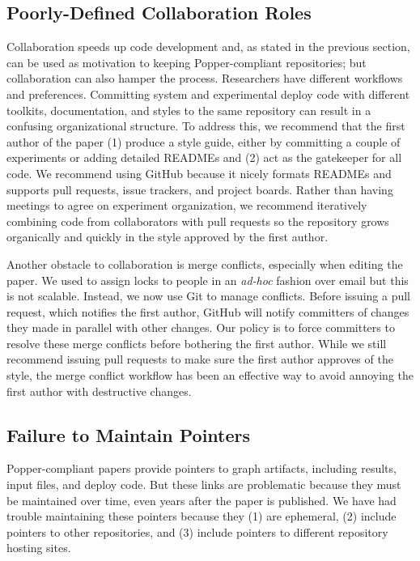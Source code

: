 \subsection{Poorly-Defined Collaboration Roles}

Collaboration  speeds up code development and, as stated in the previous
section, can be used as motivation to keeping Popper-compliant repositories;
but collaboration can also hamper the process.  Researchers have different
workflows and preferences. Committing system and experimental deploy code with
different toolkits, documentation, and styles to the same repository can result
in a confusing organizational structure.  To address this, we recommend that
the first author of the paper (1) produce a style guide, either by committing a
couple of experiments or adding detailed READMEs and (2) act as the gatekeeper
for all code. We recommend using GitHub because it nicely formats READMEs and
supports pull requests, issue trackers, and project boards.  Rather than having
meetings to agree on experiment organization, we recommend iteratively
combining code from collaborators with pull requests so the repository grows
organically and quickly in the style approved by the first author.

Another obstacle to collaboration is merge conflicts, especially when editing
the paper. We used to assign locks to people in an {\it ad-hoc} fashion over
email but this is not scalable. Instead, we now use Git to manage conflicts.
Before issuing a pull request, which notifies the first author, GitHub will
notify committers of changes they made in parallel with other changes. Our
policy is to force committers to resolve these merge conflicts before bothering
the first author. While we still recommend issuing pull requests to make sure
the first author approves of the style, the merge conflict workflow has been an
effective way to avoid annoying the first author with destructive changes.

\subsection{Failure to Maintain Pointers}

Popper-compliant papers provide pointers to graph artifacts, including results,
input files, and deploy code. But these links are problematic because they must
be maintained over time, even years after the paper is published. We have had
trouble maintaining these pointers because they (1) are ephemeral, (2) include
pointers to other repositories, and (3) include pointers to different
repository hosting sites.

